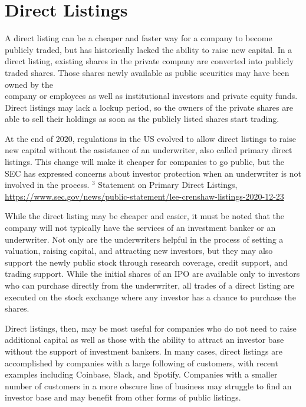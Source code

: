 \documentclass[11pt]{article}
\begin{document}
\section*{Direct Listings}
A direct listing can be a cheaper and faster way for a company to become publicly traded, but has historically lacked the ability to raise new capital. In a direct listing, existing shares in the private company are converted into publicly traded shares. Those shares newly available as public securities may have been owned by the\\
company or employees as well as institutional investors and private equity funds. Direct listings may lack a lockup period, so the owners of the private shares are able to sell their holdings as soon as the publicly listed shares start trading.

At the end of 2020, regulations in the US evolved to allow direct listings to raise new capital without the assistance of an underwriter, also called primary direct listings. This change will make it cheaper for companies to go public, but the SEC has expressed concerns about investor protection when an underwriter is not involved in the process. ${ }^{3}$ Statement on Primary Direct Listings, \href{https://www.sec.gov/news/public-statement/lee-crenshaw-listings-2020-12-23}{https://www.sec.gov/news/public-statement/lee-crenshaw-listings-2020-12-23}

While the direct listing may be cheaper and easier, it must be noted that the company will not typically have the services of an investment banker or an underwriter. Not only are the underwriters helpful in the process of setting a valuation, raising capital, and attracting new investors, but they may also support the newly public stock through research coverage, credit support, and trading support. While the initial shares of an IPO are available only to investors who can purchase directly from the underwriter, all trades of a direct listing are executed on the stock exchange where any investor has a chance to purchase the shares.

Direct listings, then, may be most useful for companies who do not need to raise additional capital as well as those with the ability to attract an investor base without the support of investment bankers. In many cases, direct listings are accomplished by companies with a large following of customers, with recent examples including Coinbase, Slack, and Spotify. Companies with a smaller number of customers in a more obscure line of business may struggle to find an investor base and may benefit from other forms of public listings.
\end{document}
